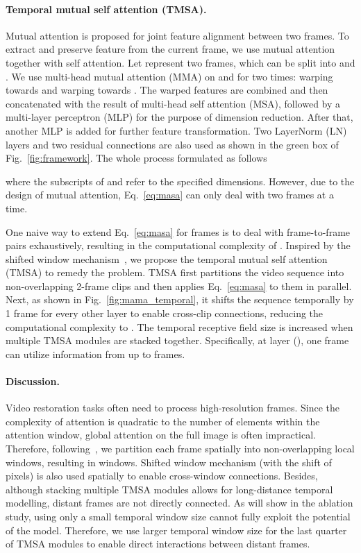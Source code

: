 \documentclass[10pt,twocolumn,letterpaper]{article}
\newlength \g
\begin{document}
\vspace{-0.4cm}
\paragraph{Temporal mutual self attention (TMSA).}
Mutual attention is proposed for joint feature alignment between two frames. To extract and preserve feature from the current frame, we use mutual attention together with self attention. Let  represent two frames, which can be split into  and . We use multi-head mutual attention (MMA) on  and  for two times: warping  towards  and warping  towards . The warped features are combined and then concatenated with the result of multi-head self attention (MSA), followed by a multi-layer perceptron (MLP) for the purpose of dimension reduction. After that, another MLP is added for further feature transformation. Two LayerNorm (LN) layers and two residual connections are also used as shown in the green box of Fig.~\ref{fig:framework}. The whole process formulated as follows

where the subscripts of  and  refer to the specified dimensions. However, due to the design of mutual attention, Eq.~\eqref{eq:masa} can only deal with two frames at a time.

One naive way to extend Eq.~\eqref{eq:masa} for  frames is to deal with frame-to-frame pairs exhaustively, resulting in the computational complexity of . Inspired by the shifted window mechanism~\cite{liu2021swin, liu2021videoSwinT}, we propose the temporal mutual self attention (TMSA) to remedy the problem. TMSA first partitions the video sequence into non-overlapping 2-frame clips and then applies Eq.~\eqref{eq:masa} to them in parallel. Next, as shown in Fig.~\ref{fig:mama_temporal}, it shifts the sequence temporally by 1 frame for every other layer to enable cross-clip connections, reducing the computational complexity to . The temporal receptive field size is increased when multiple TMSA modules are stacked together. Specifically, at layer  (), one frame can utilize information from up to  frames.


\vspace{-0.4cm}
\paragraph{Discussion.}
Video restoration tasks often need to process high-resolution frames. Since the complexity of attention is quadratic to the number of elements within the attention window, global attention on the full image is often impractical. Therefore, following~\cite{liu2021swin, liang21swinir}, we partition each frame spatially into non-overlapping  local windows, resulting in  windows. Shifted window mechanism (with the shift of  pixels) is also used spatially to enable cross-window connections. Besides, although stacking multiple TMSA modules allows for long-distance temporal modelling, distant frames are not directly connected. As will show in the ablation study, using only a small temporal window size cannot fully exploit the potential of the model. Therefore, we use larger temporal window size for the last quarter of TMSA modules to enable direct interactions between distant frames.
\end{document}
